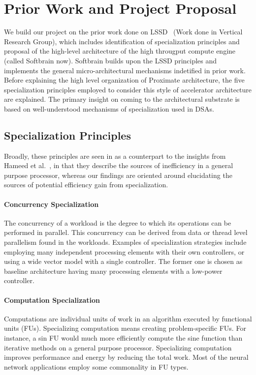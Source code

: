 \section{Prior Work and Project Proposal} \label{sec:prior}

We build our project on the prior work done on LSSD~\cite{nowatzki2016pushing} (Work done in Vertical Research Group), which includes identification of specialization principles and proposal of the
high-level architecture of the high througput compute engine (called Softbrain now). Softbrain builds 
upon the LSSD principles and implements the general micro-architectural mechanisms indetified in prior work. 
Before explaining the high level organization of Proximate architecture, the five
specialization principles employed to consider this style of accelerator architecture are explained. 
The primary insight 
on coming to the architectural substrate is based on well-understood mechanisms of specialization used in
DSAs. 

\subsection{Specialization Principles}
Broadly, these principles are seen in as a counterpart to the insights from Hameed et al.~\cite{1815968}, in that they describe the sources of inefficiency in a general purpose processor, whereas our findings are oriented around
elucidating the sources of potential efficiency gain from specialization.

\paragraph{Concurrency Specialization}
The concurrency of a workload is the degree to which its operations can be
performed in parallel. This concurrency can be derived from data or thread level parallelism found in the
workloads. Examples of specialization strategies include employing many independent processing elements
with their own controllers, or using a wide vector model with a single controller. The former one is chosen as
baseline architecture having many processing elements with a low-power controller.

\paragraph{Computation Specialization} Computations are individual units of work in an algorithm executed by
functional units (FUs). Specializing computation means creating problem-specific FUs. For instance, a sin
FU would much more efficiently compute the sine function than iterative methods on a general purpose
processor. Specializing computation improves performance and energy by reducing the total work. Most of
the neural network applications employ some commonality in FU types.

